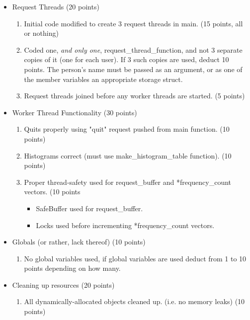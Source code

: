 \documentclass[12pt]{extarticle}
\begin{document}
\begin{itemize}
        \setlength\itemsep{-0.1em}
        
        \item Request Threads (20 points)
        		\begin{enumerate}
        		\setlength\itemsep{-0.1em}
        			\item Initial code modified to create 3 request threads in main. (15 points, all or nothing)
			\item Coded one, \emph{and only one}, request\_thread\_function, and not 3 separate copies of it (one for each user). If 3 such copies are used, deduct 10 points. The person's name must be passed as an argument, or as one of the member variables an appropriate storage struct.
			\item Request threads joined before any worker threads are started. (5 points)
		\end{enumerate}
	\item Worker Thread Functionality (30 points)
		\begin{enumerate}
		\setlength\itemsep{-0.1em}
			\item Quits properly using "quit" request pushed from main function. (10 points)
			\item Histograms correct (must use make\_histogram\_table function). (10 points)
			\item Proper thread-safety used for request\_buffer and *frequency\_count vectors. (10 points
				\begin{itemize}
				\setlength\itemsep{-0.1em}
					\item SafeBuffer used for request\_buffer.
					\item Locks used before incrementing *frequency\_count vectors.
				\end{itemize}
		\end{enumerate}
	\item Globals (or rather, lack thereof) (10 points)
		\begin{enumerate}
        		\setlength\itemsep{-0.1em}
			\item No global variables used, if global variables are used deduct from 1 to 10 points depending on how many.
		\end{enumerate}
	\item Cleaning up resources (20 points)
		\begin{enumerate}
		\setlength\itemsep{-0.1em}
			\item All dynamically-allocated objects cleaned up. (i.e. no memory leaks) (10 points)

\end{enumerate}
\end{itemize}
\end{document}
